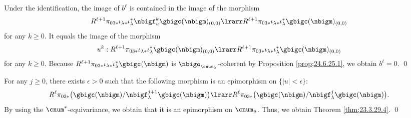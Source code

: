 \documentclass[a4,10pt]{article}
\begin{document}
Under the identification,
the image of $b^{\ell}$
is contained in the image of
the morphism
\[
 R^{\ell+1}\pi_{03\ast}
 \iota_{\lambda\ast}\iota_{\lambda}^{\ast}
      \nbigf_u^k\gbigc(\nbigm)_{(0,0)}
      \lrarr
 R^{\ell+1}\pi_{03\ast}
 \iota_{\lambda\ast}\iota_{\lambda}^{\ast}
      \gbigc(\nbigm)_{(0,0)}
\]
for any $k\geq 0$.
It equals the image of the morphism
\[
 u^k:
 R^{\ell+1}\pi_{03\ast}
 \iota_{\lambda\ast}\iota_{\lambda}^{\ast}
      \gbigc(\nbigm)_{(0,0)}
      \lrarr
 R^{\ell+1}\pi_{03\ast}
 \iota_{\lambda\ast}\iota_{\lambda}^{\ast}
      \gbigc(\nbigm)_{(0,0)}
\]
for any $k\geq 0$.
Because
$R^{\ell+1}\pi_{03\ast}
 \iota_{\lambda\ast}\iota_{\lambda}^{\ast}
      \gbigc(\nbigm)$
is $\nbigo_{\cnum_{\lambda}}$-coherent by Proposition \ref{prop;24.6.25.1},
we obtain $b^{\ell}=0$.
\hfill\qed

\vspace{.1in}

For any $j\geq 0$,
there exists $\epsilon>0$ such that
the following morphism is an epimorphism
on $\{|u|<\epsilon\}$:
\[
     R^{\ell}\pi_{03\ast}\bigl(
     \gbigc(\nbigm)/\nbigf_{\lambda}^{j+1}\gbigc(\nbigm)
 \bigr)
      \lrarr \\
            R^{\ell}\pi_{03\ast}\bigl(
      \gbigc(\nbigm)/\nbigf_{\lambda}^j\gbigc(\nbigm)
      \bigr).
\]
By using the $\cnum^{\ast}$-equivariance,
we obtain that
it is an epimorphism on $\cnum_u$.
Thus, we obtain Theorem \ref{thm;23.3.29.4}.
\hfill\qed      
\end{document}
